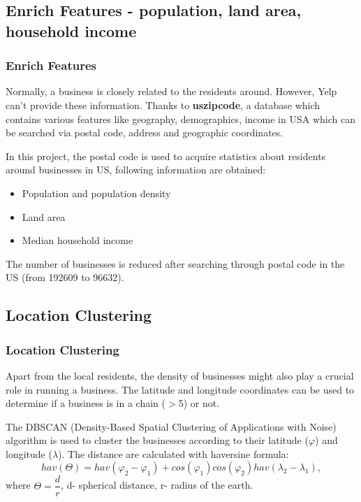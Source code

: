 \documentclass{beamer}
\begin{document}
\subsection{Enrich Features - population, land area, household income}
\begin{frame}
\frametitle{Enrich Features}
Normally, a business is closely related to the residents around. However, Yelp can't provide these information. Thanks to \textbf{uszipcode}, a database which contains various features like geography, demographics, income in USA which can be searched via postal code, address and geographic coordinates.\vspace{1em}

In this project, the postal code is used to acquire statistics about residents around businesses in US, following information are obtained:\vspace{1em}
\begin{itemize}
	\item Population and population density
	\item Land area
	\item Median household income
\end{itemize}

The number of businesses is reduced after searching through postal code in the US (from 192609 to 96632).
\end{frame}

\subsection{Location Clustering}
\begin{frame}
\frametitle{Location Clustering}
Apart from the local residents, the density of businesses might also play a crucial role in running a business. The latitude and longitude coordinates can be used to determine if a business is in a chain ($>$5) or not.\vspace{1em}

The DBSCAN (Density-Based Spatial Clustering of Applications with Noise) algorithm is used to cluster the businesses according to their latitude ($\varphi$) and longitude ($\lambda$). The distance are calculated with haversine formula:
\begin{equation*}
	hav(\Theta) = hav(\varphi_2 -\varphi_1) + cos(\varphi_1)cos(\varphi_2)hav(\lambda_2 - \lambda_1),
\end{equation*} 
where $\Theta = \dfrac{d}{r}$, d- spherical distance, r- radius of the earth.

\end{frame}
\end{document}
